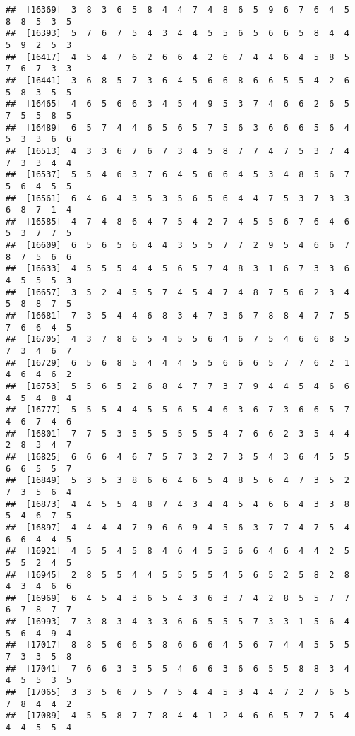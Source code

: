 \documentclass[
]{book}
\begin{document}
\begin{verbatim}
##  [16369]  3  8  3  6  5  8  4  4  7  4  8  6  5  9  6  7  6  4  5  8  8  5  3  5
##  [16393]  5  7  6  7  5  4  3  4  4  5  5  6  5  6  6  5  8  4  4  5  9  2  5  3
##  [16417]  4  5  4  7  6  2  6  6  4  2  6  7  4  4  6  4  5  8  5  7  6  7  3  3
##  [16441]  3  6  8  5  7  3  6  4  5  6  6  8  6  6  5  5  4  2  6  5  8  3  5  5
##  [16465]  4  6  5  6  6  3  4  5  4  9  5  3  7  4  6  6  2  6  5  7  5  5  8  5
##  [16489]  6  5  7  4  4  6  5  6  5  7  5  6  3  6  6  6  5  6  4  5  3  3  6  6
##  [16513]  4  3  3  6  7  6  7  3  4  5  8  7  7  4  7  5  3  7  4  7  3  3  4  4
##  [16537]  5  5  4  6  3  7  6  4  5  6  6  4  5  3  4  8  5  6  7  5  6  4  5  5
##  [16561]  6  4  6  4  3  5  3  5  6  5  6  4  4  7  5  3  7  3  3  6  8  7  1  4
##  [16585]  4  7  4  8  6  4  7  5  4  2  7  4  5  5  6  7  6  4  6  5  3  7  7  5
##  [16609]  6  5  6  5  6  4  4  3  5  5  7  7  2  9  5  4  6  6  7  8  7  5  6  6
##  [16633]  4  5  5  5  4  4  5  6  5  7  4  8  3  1  6  7  3  3  6  4  5  5  5  3
##  [16657]  3  5  2  4  5  5  7  4  5  4  7  4  8  7  5  6  2  3  4  5  8  8  7  5
##  [16681]  7  3  5  4  4  6  8  3  4  7  3  6  7  8  8  4  7  7  5  7  6  6  4  5
##  [16705]  4  3  7  8  6  5  4  5  5  6  4  6  7  5  4  6  6  8  5  7  3  4  6  7
##  [16729]  6  5  6  8  5  4  4  4  5  5  6  6  6  5  7  7  6  2  1  4  6  4  6  2
##  [16753]  5  5  6  5  2  6  8  4  7  7  3  7  9  4  4  5  4  6  6  4  5  4  8  4
##  [16777]  5  5  5  4  4  5  5  6  5  4  6  3  6  7  3  6  6  5  7  4  6  7  4  6
##  [16801]  7  7  5  3  5  5  5  5  5  5  4  7  6  6  2  3  5  4  4  2  8  3  4  7
##  [16825]  6  6  6  4  6  7  5  7  3  2  7  3  5  4  3  6  4  5  5  6  6  5  5  7
##  [16849]  5  3  5  3  8  6  6  4  6  5  4  8  5  6  4  7  3  5  2  7  3  5  6  4
##  [16873]  4  4  5  5  4  8  7  4  3  4  4  5  4  6  6  4  3  3  8  5  4  6  7  5
##  [16897]  4  4  4  4  7  9  6  6  9  4  5  6  3  7  7  4  7  5  4  6  6  4  4  5
##  [16921]  4  5  5  4  5  8  4  6  4  5  5  6  6  4  6  4  4  2  5  5  5  2  4  5
##  [16945]  2  8  5  5  4  4  5  5  5  5  4  5  6  5  2  5  8  2  8  4  3  4  6  6
##  [16969]  6  4  5  4  3  6  5  4  3  6  3  7  4  2  8  5  5  7  7  6  7  8  7  7
##  [16993]  7  3  8  3  4  3  3  6  6  5  5  5  7  3  3  1  5  6  4  5  6  4  9  4
##  [17017]  8  8  5  6  6  5  8  6  6  6  4  5  6  7  4  4  5  5  5  7  3  3  5  8
##  [17041]  7  6  6  3  3  5  5  4  6  6  3  6  6  5  5  8  8  3  4  4  5  5  3  5
##  [17065]  3  3  5  6  7  5  7  5  4  4  5  3  4  4  7  2  7  6  5  7  8  4  4  2
##  [17089]  4  5  5  8  7  7  8  4  4  1  2  4  6  6  5  7  7  5  4  4  4  5  5  4

\end{verbatim}
\end{document}
